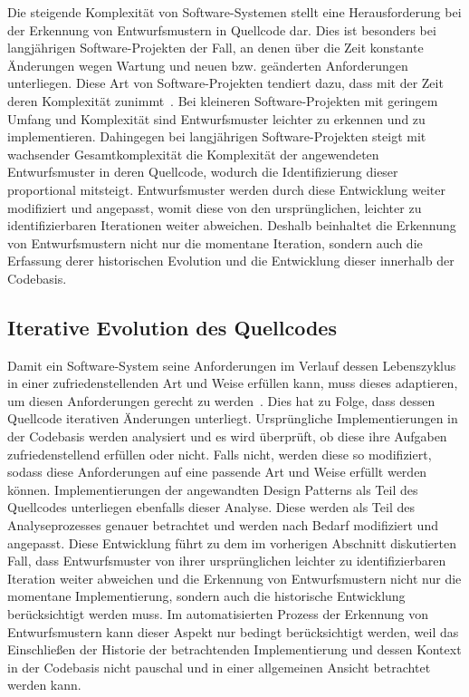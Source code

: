 Die steigende Komplexität von Software-Systemen stellt eine Herausforderung bei der Erkennung von Entwurfsmustern in Quellcode dar.
Dies ist besonders bei langjährigen Software-Projekten der Fall, an denen über die Zeit konstante Änderungen wegen Wartung und neuen bzw. geänderten Anforderungen unterliegen.
Diese Art von Software-Projekten tendiert dazu, dass mit der Zeit deren Komplexität zunimmt~\cite[S. 7]{Suh-2010}. 
Bei kleineren Software-Projekten mit geringem Umfang und Komplexität sind Entwurfsmuster leichter zu erkennen und zu implementieren.
Dahingegen bei langjährigen Software-Projekten steigt mit wachsender Gesamtkomplexität die Komplexität der angewendeten Entwurfsmuster in deren Quellcode, wodurch die Identifizierung dieser proportional mitsteigt.
Entwurfsmuster werden durch diese Entwicklung weiter modifiziert und angepasst, womit diese von den ursprünglichen, leichter zu identifizierbaren Iterationen weiter abweichen. 
Deshalb beinhaltet die Erkennung von Entwurfsmustern nicht nur die momentane Iteration, sondern auch die Erfassung derer historischen Evolution und die Entwicklung dieser innerhalb der Codebasis.

\pagebreak

\subsection*{Iterative Evolution des Quellcodes}

Damit ein Software-System seine Anforderungen im Verlauf dessen Lebenszyklus in einer zufriedenstellenden Art und Weise erfüllen kann, muss dieses adaptieren, um diesen Anforderungen gerecht zu werden~\cite[S. 108]{10.1007/BFb0017737}.
Dies hat zu Folge, dass dessen Quellcode iterativen Änderungen unterliegt. Ursprüngliche Implementierungen in der Codebasis werden analysiert und es wird überprüft, ob diese ihre Aufgaben zufriedenstellend erfüllen oder nicht.
Falls nicht, werden diese so modifiziert, sodass diese Anforderungen auf eine passende Art und Weise erfüllt werden können. Implementierungen der angewandten Design Patterns als Teil des Quellcodes unterliegen ebenfalls dieser Analyse.
Diese werden als Teil des Analyseprozesses genauer betrachtet und werden nach Bedarf modifiziert und angepasst. Diese Entwicklung führt zu dem im vorherigen Abschnitt diskutierten Fall, dass Entwurfsmuster von ihrer ursprünglichen leichter zu identifizierbaren Iteration weiter abweichen und die Erkennung von Entwurfsmustern nicht nur die momentane Implementierung, sondern auch die historische Entwicklung berücksichtigt werden muss. 
Im automatisierten Prozess der Erkennung von Entwurfsmustern kann dieser Aspekt nur bedingt berücksichtigt werden, weil das Einschließen der Historie der betrachtenden Implementierung und dessen Kontext in der Codebasis nicht pauschal und in einer allgemeinen Ansicht betrachtet werden kann.

